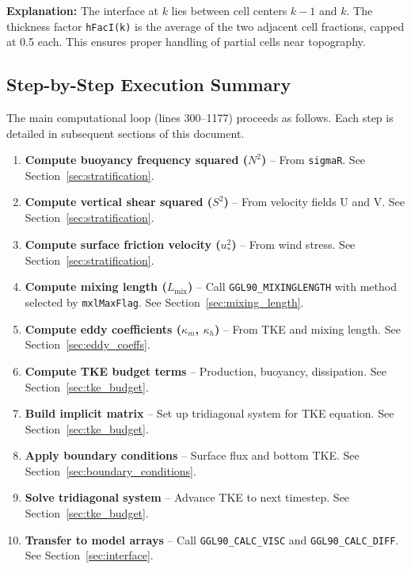 \documentclass[12pt,letterpaper]{article}
\newcommand{\KM}{\kappa_m}
\newcommand{\KH}{\kappa_h}
\newcommand{\Lmix}{L_{\mathrm{mix}}}
\begin{document}
\textbf{Explanation:} The interface at $k$ lies between cell centers $k-1$ and
$k$. The thickness factor \texttt{hFacI(k)} is the average of the two adjacent
cell fractions, capped at 0.5 each. This ensures proper handling of partial
cells near topography.

\subsection{Step-by-Step Execution Summary}

The main computational loop (lines 300--1177) proceeds as follows. Each step
is detailed in subsequent sections of this document.

\begin{enumerate}[leftmargin=*, label=\textbf{Step \arabic*.}]
  \item \textbf{Compute buoyancy frequency squared ($N^2$)} -- From
        \texttt{sigmaR}. See Section~\ref{sec:stratification}.

  \item \textbf{Compute vertical shear squared ($S^2$)} -- From velocity
        fields U and V. See Section~\ref{sec:stratification}.

  \item \textbf{Compute surface friction velocity ($u_*^2$)} -- From wind
        stress. See Section~\ref{sec:stratification}.

  \item \textbf{Compute mixing length ($\Lmix$)} -- Call
        \texttt{GGL90\_MIXINGLENGTH} with method selected by
        \texttt{mxlMaxFlag}. See Section~\ref{sec:mixing_length}.

  \item \textbf{Compute eddy coefficients ($\KM$, $\KH$)} -- From TKE and
        mixing length. See Section~\ref{sec:eddy_coeffs}.

  \item \textbf{Compute TKE budget terms} -- Production, buoyancy,
        dissipation. See Section~\ref{sec:tke_budget}.

  \item \textbf{Build implicit matrix} -- Set up tridiagonal system for TKE
        equation. See Section~\ref{sec:tke_budget}.

  \item \textbf{Apply boundary conditions} -- Surface flux and bottom TKE.
        See Section~\ref{sec:boundary_conditions}.

  \item \textbf{Solve tridiagonal system} -- Advance TKE to next timestep.
        See Section~\ref{sec:tke_budget}.

  \item \textbf{Transfer to model arrays} -- Call \texttt{GGL90\_CALC\_VISC}
        and \texttt{GGL90\_CALC\_DIFF}. See Section~\ref{sec:interface}.
\end{enumerate}
\end{document}
